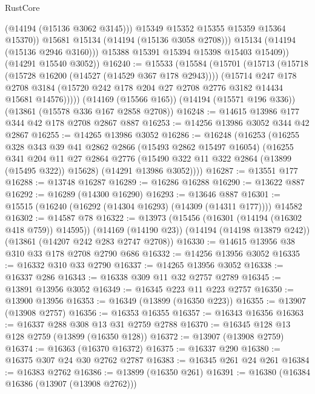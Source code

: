 \begin{lexlean}{RustCore}
\begin{coremodule}
                    (@14194 (@15136 @3062 @3145)))
                  @15349
                  @15352
                  @15355
                  @15359
                  @15364
                  @15370))
              @15681
              @15134
              (@14194 (@15136 @3058 @2708)))
            @15134
            (@14194 (@15136 @2946 @3160)))
          @15388
          @15391
          @15394
          @15398
          @15403
          @15409))
      (@14291 @15540 @3052))
@16240 := @15533
    (@15584
      (@15701
        (@15713
          (@15718 (@15728 @16200 (@14527 (@14529 @367 @178 @2943))))
          (@15714
            @247
            @178
            @2708
            @3184
            (@15720 @242 @178 @204 @27 @2708 @2776 @3182 @14434 @15681 @14576)))))
    (@14169 (@15566 @165))
    (@14194 (@15571 @196 @336))
    (@13861 (@15578 @336 @167 @2858 @2708))
@16248 := @14615 @13986 @177 @344 @42 @178 @2708 @2867 @887
@16253 := @14256 @13986 @3052 @344 @42 @2867
@16255 := @14265 @13986 @3052
@16286 := @16248
    (@16253
      (@16255
        @328
        @343
        @39
        @41
        @2862
        @2866
        (@15493 @2862 @15497 @16054)
        (@16255
          @341
          @204
          @11
          @27
          @2864
          @2776
          (@15490 @322 @11 @322 @2864 (@13899 (@15495 @322)) @15628)
          (@14291 @13986 @3052))))
@16287 := @13551 @177
@16288 := @13748 @16287
@16289 := @16286 @16288
@16290 := @13622 @887
@16292 := @16289 (@14300 @16290)
@16293 := @13646 @887
@16301 := @15515 (@16240 (@16292 (@14304 @16293) (@14309 (@14311 @177)))) @14582
@16302 := @14587 @78
@16322 := @13973
    (@15456 (@16301 (@14194 (@16302 @418 @759)) @14595))
    (@14169 (@14190 @23))
    (@14194 (@14198 @13879 @242))
    (@13861 (@14207 @242 @283 @2747 @2708))
@16330 := @14615 @13956 @38 @310 @33 @178 @2708 @2790 @686
@16332 := @14256 @13956 @3052
@16335 := @16332 @310 @33 @2790
@16337 := @14265 @13956 @3052
@16338 := @16337 @286
@16343 := @16338 @309 @11 @32 @2757 @2789
@16345 := @13891 @13956 @3052
@16349 := @16345 @223 @11 @223 @2757
@16350 := @13900 @13956
@16353 := @16349 (@13899 (@16350 @223))
@16355 := @13907 (@13908 @2757)
@16356 := @16353 @16355
@16357 := @16343 @16356
@16363 := @16337 @288 @308 @13 @31 @2759 @2788
@16370 := @16345 @128 @13 @128 @2759 (@13899 (@16350 @128))
@16372 := @13907 (@13908 @2759)
@16374 := @16363 (@16370 @16372)
@16375 := @16337 @290
@16380 := @16375 @307 @24 @30 @2762 @2787
@16383 := @16345 @261 @24 @261
@16384 := @16383 @2762
@16386 := @13899 (@16350 @261)
@16391 := @16380 (@16384 @16386 (@13907 (@13908 @2762)))

\end{coremodule}
\end{lexlean}
